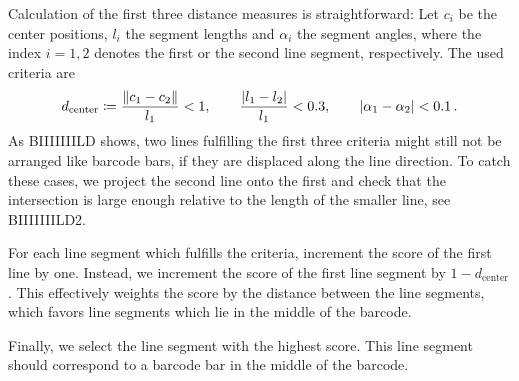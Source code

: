Calculation of the first three distance measures is straightforward: Let $c_i$
be the center positions, $l_i$ the segment lengths and $\alpha_i$ the segment angles, where the index $i=1,2$
denotes the first or the second line segment, respectively. The used criteria are
\begin{equation*}
d_{\text{center}}\coloneqq\frac{\lVert c_1-c_2\rVert}{l_1}<1,\qquad \frac{\lvert l_1-l_2\rvert}{l_1}<0.3,\qquad \lvert\alpha_1-\alpha_2\rvert<0.1\,.
\end{equation*}
As BIIIIIIILD shows, two lines fulfilling the first three criteria might
still not be arranged like barcode bars, if they are displaced along the line
direction. To catch these cases, we project the second line onto the
first and check that the intersection is large enough relative to the length of
the smaller line, see BIIIIIIILD2.

For each line segment which fulfills the criteria, \citeauthor{Creusot2016}
increment the score of the first line by one. Instead, we increment the score of the
first line segment by $1-d_{\text{center}}$. This effectively weights the score by the distance
between the line segments, which favors line segments which lie in
the middle of the barcode.

Finally, we select the line segment with the highest score. This line segment
should correspond to a barcode bar in the middle of the barcode.

